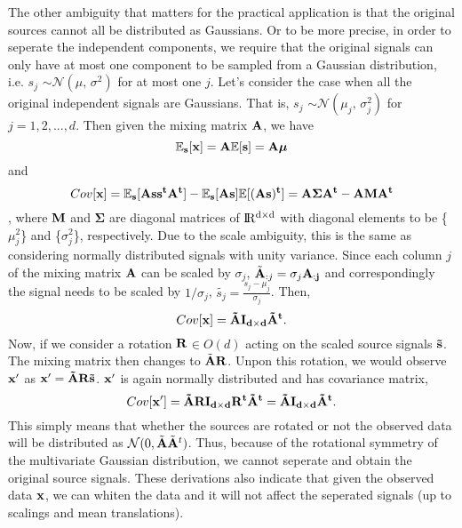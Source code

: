 \documentclass[aps,prl,preprint,superscriptaddress]{revtex4-2}
\begin{document}
The other ambiguity that matters for the practical application is that the original sources cannot all be distributed as Gaussians. Or to be more precise, in order to seperate the independent components, we require that the original signals can only have at most one component to be sampled from a Gaussian distribution, i.e. $s_{j}$ $\sim \mathcal{N}(\mu,\,\sigma^{2})$ for at most one $j$. Let's consider the case when all the original independent signals are Gaussians. That is, $s_{j}$ $\sim \mathcal{N}(\mu_{j},\,\sigma_{j}^{2})$ for $j = 1, 2, ..., d$. Then given the mixing matrix $\bf{A}$, we have 
\begin{equation}
\mathbb{E}_{\bf{s}}[\bf{x}] = \bf{A}\mathbb{E}[\bf{s}] = \bf{A}\bm{\mu}
\end{equation}
 and 
\begin{equation}
Cov[\bf{x}] = \mathbb{E}_{\bf{s}}[\bf{As}\bf{s}^t\bf{A}^{t}]-\mathbb{E}_{\bf{s}}[\bf{As}]\mathbb{E}[(\bf{As})^{t}] =  \bf{A}\bm{\Sigma}\bf{A}^{t}-\bf{A}\bf{M}\bf{A}^{t}
\end{equation} 
, where $\bf{M}$ and $\bm{\Sigma}$ are diagonal matrices of $\rm I\!R^{d\times d}$ with diagonal elements to be \{$\mu_{j}^{2}$\} and \{$\sigma_{j}^{2}$\}, respectively. Due to the scale ambiguity, this is the same as considering normally distributed signals with unity variance. Since each column $j$ of the mixing matrix $\bf{A}$ can be scaled by $\sigma_{j}$, $\tilde{\bf{A}}_{:j} = \sigma_{j}\bf{A}_{:j}$ and correspondingly the signal needs to be scaled by $1/\sigma_{j}$, $\tilde{s_{j}} = \frac{s_{j}-\mu_{j}}{\sigma_{j}}$. Then, 
\begin{equation}
Cov[\bf{x}] = \tilde{\bf{A}}\bf{I}_{d\times d}\tilde{\bf{A}}^{t}.
\end{equation}
Now, if we consider a rotation $\bf{R} $$\in O(d)$ acting on the scaled source signals $\bf{\tilde{s}}$. The mixing matrix then changes to $\tilde{\bf{A}}\bf{R}$. Unpon this rotation, we would observe $\bf{x'}$ as $\bf{x'} = \tilde{\bf{A}}\bf{R}\tilde{\bf{s}}$. $\bf{x'}$ is again normally distributed and has covariance matrix,
\begin{equation}
Cov[\bf{x'}] = \tilde{\bf{A}}\bf{R}\bf{I}_{d\times d}\bf{R}^{t}\tilde{\bf{A}}^{t} = \tilde{\bf{A}}\bf{I}_{d\times d}\tilde{\bf{A}}^{t}. 
\end{equation} This simply means that whether the sources are rotated or not the observed data will be distributed as $\mathcal{N}(0, \tilde{\bf{A}}\tilde{\bf{A}}^{t})$. Thus, because of the rotational symmetry of the multivariate Gaussian distribution, we cannot seperate and obtain the original source signals. These derivations also indicate that given the observed data $\bf{x}$, we can whiten the data and it will not affect the seperated signals (up to scalings and mean translations).   
\end{document}
